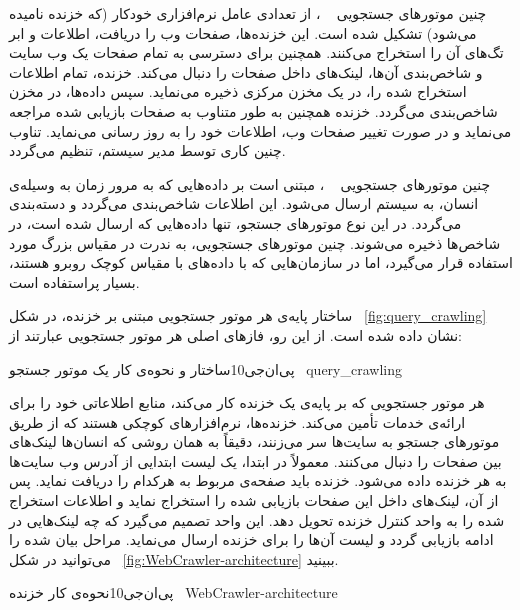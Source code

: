 چنین موتورهای جستجویی
~\cite{Web-Crawling}
، از تعدادی عامل نرم‌افزاری خودکار (که خزنده نامیده می‌شود) تشکیل شده است. این خزنده‌ها، صفحات وب را دریافت، اطلاعات و ابر تگ‌های آن را استخراج می‌کنند. همچنین برای دسترسی به تمام صفحات یک وب سایت و شاخص‌بندی آن‌ها، لینک‌های داخل صفحات را دنبال می‌کند. خزنده، تمام اطلاعات استخراج شده را، در یک مخزن مرکزی ذخیره می‌نماید. سپس داده‌ها، در مخزن شاخص‌بندی می‌گردد. خزنده همچنین به طور متناوب به صفحات بازیابی شده مراجعه می‌نماید و در صورت تغییر صفحات وب، اطلاعات خود را به روز رسانی می‌نماید. تناوب چنین کاری توسط مدیر سیستم، تنظیم می‌گردد.


چنین موتورهای جستجویی
~\cite{Web-Crawling}
، مبتنی است بر داده‌هایی که به مرور زمان به وسیله‌ی انسان، به سیستم ارسال می‌شود. این اطلاعات شاخص‌بندی می‌گردد و دسته‌بندی می‌گردد. در این نوع موتورهای جستجو، تنها داده‌هایی که ارسال شده است، در شاخص‌ها ذخیره می‌شوند. چنین موتورهای جستجویی، به ندرت در مقیاس بزرگ مورد استفاده قرار می‌گیرد، اما در سازمان‌هایی که با داده‌های با مقیاس کوچک روبرو هستند، بسیار پراستفاده است.


ساختار پایه‌ی هر موتور جستجویی مبتنی بر خزنده، در شکل ~\ref{fig:query_crawling} نشان داده شده است. از این رو، فازهای اصلی هر موتور جستجویی عبارتند از:

‌پی‌ان‌جی{10}{ساختار و نحوه‌ی کار یک موتور جستجو
~\cite{Search-in-cloud}}{query_crawling}


هر موتور جستجویی که بر پایه‌ی یک خزنده کار می‌کند، منابع اطلاعاتی خود را برای ارائه‌ی خدمات تأمین می‌کند. خزنده‌ها، نرم‌افزارهای کوچکی هستند که از طریق موتورهای جستجو به سایت‌ها سر می‌زنند، دقیقاً به همان روشی که انسان‌ها لینک‌های بین صفحات را دنبال می‌کنند. معمولاً در ابتدا، یک لیست ابتدایی از آدرس وب سایت‌ها به هر خزنده داده می‌شود. خزنده باید صفحه‌ی مربوط به هرکدام را دریافت نماید. پس از آن، لینک‌های داخل این صفحات بازیابی شده را استخراج نماید و اطلاعات استخراج شده را به واحد کنترل خزنده تحویل دهد. این واحد تصمیم می‌گیرد که چه لینک‌هایی در ادامه بازیابی گردد و لیست آن‌ها را برای خزنده ارسال می‌نماید.
مراحل بیان شده را می‌توانید در شکل ~\ref {fig:WebCrawler-architecture} ببینید.

‌پی‌ان‌جی{10}{نحوه‌ی کار خزنده
~\cite{Googlebot}}{WebCrawler-architecture}


